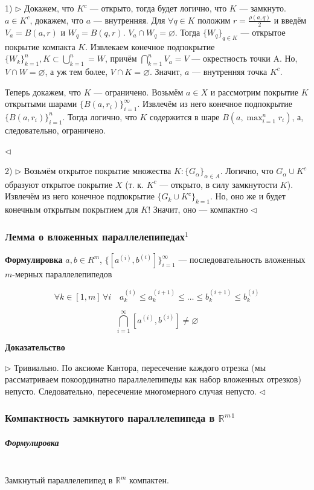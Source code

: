 \documentclass{article}
\let\vanillasubparagraph\subparagraph
\renewcommand{\subparagraph}[1]{\vanillasubparagraph{#1}\mbox{}\\}
\begin{document}
1) $\rhd$ Докажем, что $K^c$ --- открыто, тогда будет логично, что $K$ --- замкнуто. $a \in K^c$, докажем, что $a$ --- внутренняя. Для $\forall q \in K$ положим $r = \frac{\rho(a, q)}{2}$ и введём $V_a = B(a, r)$ и $W_q = B(q, r)$. $V_a \cap W_q = \varnothing$. Тогда $\{W_q\}_{q \in K}$ --- открытое покрытие компакта $K$. Извлекаем конечное подпокрытие $\{W_k\}_{k = 1}^n, K \subset \bigcup_{k = 1}^n = W$, причём $\bigcap_{k = 1}^n V_a = V$ --- окрестность точки A. Но, $V \cap W = \varnothing$, а уж тем более, $V \cap K = \varnothing$. Значит, $a$ --- внутренняя точка $K^c$.

Теперь докажем, что $K$ --- ограничено. Возьмём $a \in X$ и рассмотрим покрытие $K$ открытыми шарами $\{B(a, r_i)\}_{i = 1}^\infty$. Извлечём из него конечное подпокрытие $\{B(a, r_i)\}_{i = 1}^n$. Тогда логично, что $K$ содержится в шаре $B(a, \max_{i = 1}^n{r_i})$, а, следовательно, ограничено.

$\lhd$

2) $\rhd$ Возьмём открытое покрытие множества $K: \{G_\alpha\}_{\alpha \in A}$. Логично, что $G_\alpha \cup K^c$ 
образуют открытое покрытие $X$ (т. к. $K^c$ --- открыто, в силу замкнутости $K$). Извлечём из него конечное подпокрытие $\{G_k \cup K^c\}_{k = 1
}$. Но, оно же и будет конечным открытым покрытием для $K$! Значит, оно --- компактно $\lhd$


\subsubsection{Лемма о вложенных параллелепипедах\texorpdfstring{$^1$}{}}
\textbf{Формулировка}
$a, b \in R^m$, $\{[a^{(i)}, b^{(i)}]\}_{i=1}^\infty$ --- последовательность вложенных $m$-мерных параллелепипедов

$$
\forall k\in [1, m] \, \forall i \quad a^{(i)}_k \le a^{(i+1)}_k \le \ldots \le b^{(i+1)}_k \le b^{(i)}_k
$$

$$
\bigcap_{i=1}^\infty [a^{(i)}, b^{(i)}] \ne \varnothing
$$

\textbf{Доказательство}

$\rhd$ Тривиально. По аксиоме Кантора, пересечение каждого отрезка (мы рассматриваем покоординатно параллелепипеды как набор вложенных отрезков) непусто. Следовательно, пересечение многомерного случая непусто. $\lhd$


\subsubsection{Компактность замкнутого параллелепипеда в \texorpdfstring{$\mathbb{R}^m$}{m-мерном R}\texorpdfstring{$^1$}{}}
\subparagraph{Формулировка}
Замкнутый параллелепипед в $\mathbb{R}^m$ компактен.
\end{document}
